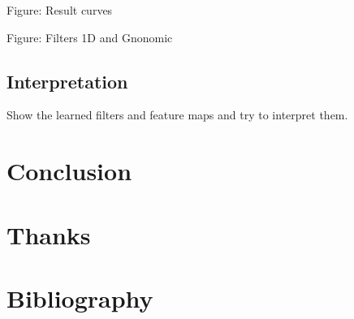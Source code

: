\documentclass[preprint,12pt,authoryear]{elsarticle}
\newcommand{\assign}[1]{{\color[rgb]{.8,.5,.8}{Assigned: #1 }}}
\begin{document}
Figure: Result curves 

Figure: Filters 1D and Gnonomic

\subsection{Interpretation}
\assign{Nathanaël, Tomek, Michaël}

Show the learned filters and feature maps and try to interpret them.

\section{Conclusion}
\assign{Nathanaël, Tomek, Michaël}

\section*{Thanks}



\section*{Bibliography}
 

\end{document}
